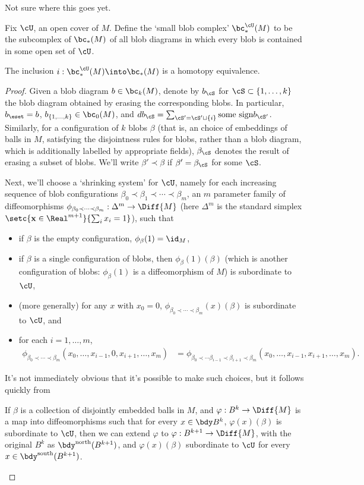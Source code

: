 Not sure where this goes yet.

Fix $\cU$, an open cover of $M$. Define the `small blob complex' $\bc^{\cU}_*(M)$ to be the subcomplex of $\bc_*(M)$ of all blob diagrams in which every blob is contained in some open set of $\cU$.

\begin{lem}
The inclusion $i: \bc^{\cU}_*(M) \into \bc_*(M)$ is a homotopy equivalence.
\end{lem}
\begin{proof}
Given a blob diagram $b \in \bc_k(M)$, denote by $b_\cS$ for $\cS \subset \{1, \ldots, k\}$ the blob diagram obtained by erasing the corresponding blobs. In particular, $b_\eset = b$, $b_{\{1,\ldots,k\}} \in \bc_0(M)$, and $d b_\cS = \sum_{\cS' = \cS'\sqcup\{i\}} \text{some sign} b_{\cS'}$.
Similarly, for a configuration of $k$ blobs $\beta$ (that is, an choice of embeddings of balls in $M$, satisfying the disjointness rules for blobs, rather than a blob diagram, which is additionally labelled by appropriate fields), $\beta_\cS$ denotes the result of erasing a subset of blobs. We'll write $\beta' \prec \beta$ if $\beta' = \beta_\cS$ for some $\cS$.

Next, we'll choose a `shrinking system' for $\cU$, namely for each increasing sequence of blob configurations
$\beta_0 \prec \beta_1 \prec \cdots \prec \beta_m$, an $m$ parameter family of diffeomorphisms
$\phi_{\beta_0 \prec \cdots \prec \beta_m} : \Delta^m \to \Diff{M}$ (here $\Delta^m$ is the standard simplex $\setc{\mathbf{x} \in \Real^{m+1}}{\sum_i x_i = 1}$), such that
\begin{itemize}
\item if $\beta$ is the empty configuration, $\phi_{\beta}(1) = \id_M$,
\item if $\beta$ is a single configuration of blobs, then $\phi_{\beta}(1)(\beta)$ (which is another configuration of blobs: $\phi_{\beta}(1)$ is a diffeomorphism of $M$) is subordinate to $\cU$,
\item (more generally) for any $x$ with $x_0 = 0$, $\phi_{\beta_0 \prec \cdots \prec \beta_m}(x)(\beta)$ is subordinate to $\cU$, and
\item for each $i = 1, \ldots, m$,
\begin{align*}
\phi_{\beta_0 \prec \cdots \prec \beta_m}(x_0, \ldots, x_{i-1},0,x_{i+1},\ldots,x_m) & = \phi_{\beta_0 \prec \cdots \beta_{i-1} \prec \beta_{i+1} \prec \beta_m}(x_0,\ldots, x_{i-1},x_{i+1},\ldots,x_m).
\end{align*}
\end{itemize}
It's not immediately obvious that it's possible to make such choices, but it follows quickly from
\begin{claim}
If $\beta$ is a collection of disjointly embedded balls in $M$, and $\varphi: B^k \to \Diff{M}$ is a map into diffeomorphisms such that for every $x\in \bdy B^k$, $\varphi(x)(\beta)$ is subordinate to $\cU$, then we can extend $\varphi$ to $\varphi:B^{k+1} \to \Diff{M}$, with the original $B^k$ as $\bdy^{\text{north}}(B^{k+1})$, and $\varphi(x)(\beta)$ subordinate to $\cU$ for every $x \in \bdy^{\text{south}}(B^{k+1})$.


\end{claim}
\end{proof}
